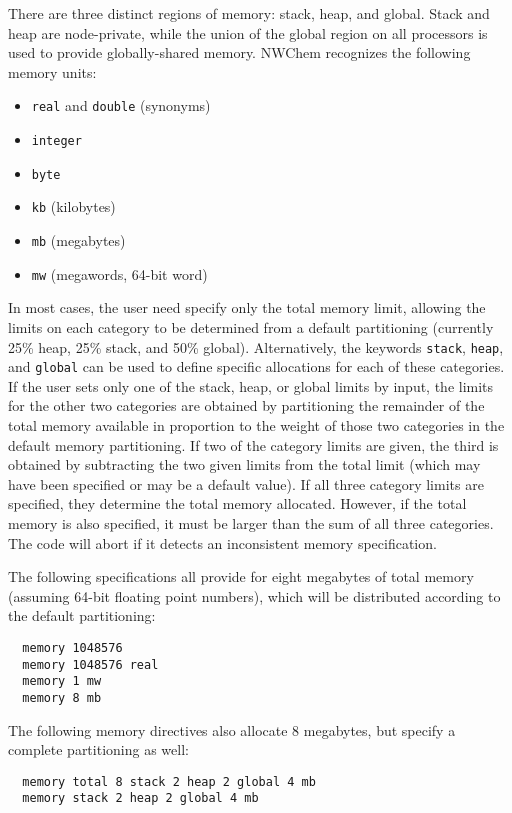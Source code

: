 There are three distinct regions of memory: stack, heap, and global.
Stack and heap are node-private, while the union of the global region
on all processors is used to provide globally-shared memory.  NWChem
recognizes the following memory units:
\begin{itemize}
\item \verb+real+ and \verb+double+ (synonyms)
\item \verb+integer+
\item \verb+byte+
\item \verb+kb+ (kilobytes)
\item \verb+mb+ (megabytes)
\item \verb+mw+ (megawords, 64-bit word)
\end{itemize}

In most cases, the user need specify only the total memory limit,
allowing the limits on each category to be determined from a default
partitioning (currently 25\% heap, 25\% stack, and 50\% global).
Alternatively, the keywords \verb+stack+, \verb+heap+, and
\verb+global+ can be used to define specific allocations for each of
these categories.  If the user sets only one of the stack, heap, or
global limits by input, the limits for the other two categories are
obtained by partitioning the remainder of the total memory available
in proportion to the weight of those two categories in the default
memory partitioning.  If two of the category limits are given, the
third is obtained by subtracting the two given limits from the total
limit (which may have been specified or may be a default value).  If
all three category limits are specified, they determine the total
memory allocated.  However, if the total memory is also specified, it
must be larger than the sum of all three categories.  The code will
abort if it detects an inconsistent memory specification.

The following specifications all provide for eight megabytes of total
memory (assuming 64-bit floating point numbers), which will be
distributed according to the default partitioning:
\begin{verbatim}
  memory 1048576
  memory 1048576 real
  memory 1 mw
  memory 8 mb
\end{verbatim}

The following memory directives also allocate 8 megabytes, but specify
a complete partitioning as well:

\begin{verbatim}
  memory total 8 stack 2 heap 2 global 4 mb
  memory stack 2 heap 2 global 4 mb
\end{verbatim}

